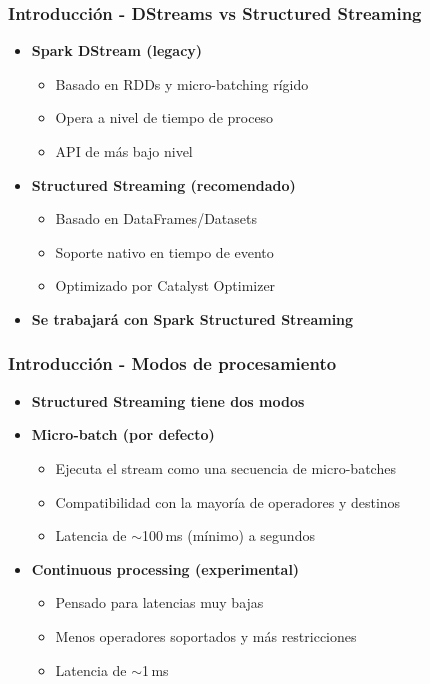 \documentclass[aspectratio=169]{beamer}
\begin{document}
\begin{frame}\frametitle{Introducción - DStreams vs Structured Streaming}
	\begin{itemize}
		\item \textbf{Spark DStream (legacy)}
		\begin{itemize}
			\item Basado en RDDs y micro-batching rígido
			\item Opera a nivel de tiempo de proceso
			\item API de más bajo nivel
		\end{itemize}
	\end{itemize}

	\vspace{1em}

	\begin{itemize}
		\item \textbf{Structured Streaming (recomendado)}
		\begin{itemize}
			\item Basado en DataFrames/Datasets
			\item Soporte nativo en tiempo de evento
			\item Optimizado por Catalyst Optimizer
		\end{itemize}

	\vspace{1em}

	\item \textbf{Se trabajará con Spark Structured Streaming}
	
\end{itemize}
\end{frame}

\begin{frame}\frametitle{Introducción - Modos de procesamiento}
	\begin{itemize}
		\item \textbf{Structured Streaming tiene dos modos}

		\vspace{1em}

		\item \textbf{Micro-batch (por defecto)}
		\begin{itemize}
			\item Ejecuta el stream como una secuencia de micro-batches
			\item Compatibilidad con la mayoría de operadores y destinos
			\item Latencia de $\sim$100\,ms (mínimo) a segundos
		\end{itemize}

		\vspace{1em}

		\item \textbf{Continuous processing (experimental)}
		\begin{itemize}
			\item Pensado para latencias muy bajas
			\item Menos operadores soportados y más restricciones
			\item Latencia de $\sim$1\,ms
		\end{itemize}
	\end{itemize}
\end{frame}
\end{document}
